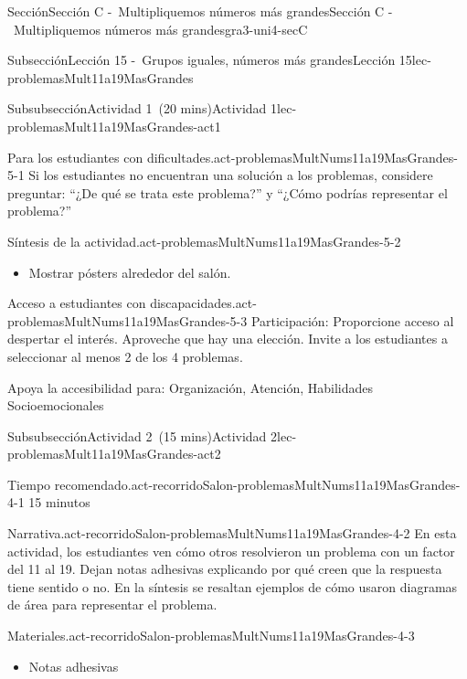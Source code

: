 \documentclass[oneside,10pt,]{article}
\begin{document}
\begin{sectionptx}{Sección}{Sección C -~Multipliquemos números más grandes}{}{Sección C -~Multipliquemos números más grandes}{}{}{gra3-uni4-secC}
\begin{subsectionptx}{Subsección}{Lección 15 -~Grupos iguales, números más grandes}{}{Lección 15}{}{}{lec-problemasMult11a19MasGrandes}
\begin{subsubsectionptx}{Subsubsección}{Actividad 1~(20 mins)}{}{Actividad 1}{}{}{lec-problemasMult11a19MasGrandes-act1}
\begin{paragraphs}{Para los estudiantes con dificultades.}{act-problemasMultNums11a19MasGrandes-5-1}
Si los estudiantes no encuentran una solución a los problemas, considere preguntar: ``¿De qué se trata este problema?'' y ``¿Cómo podrías representar el problema?''%
\end{paragraphs}%
\begin{paragraphs}{Síntesis de la actividad.}{act-problemasMultNums11a19MasGrandes-5-2}%
%
\begin{itemize}[label=\textbullet]
\item{}Mostrar pósters alrededor del salón.%
\end{itemize}
\end{paragraphs}%
\begin{paragraphs}{Acceso a estudiantes con discapacidades.}{act-problemasMultNums11a19MasGrandes-5-3}%
Participación: Proporcione acceso al despertar el interés. Aproveche que hay una elección. Invite a los estudiantes a seleccionar al menos 2 de los 4 problemas.%
\par
Apoya la accesibilidad para: Organización, Atención, Habilidades Socioemocionales%
\end{paragraphs}%
\end{subsubsectionptx}
%
%
\typeout{************************************************}
\typeout{************************************************}
%
\begin{subsubsectionptx}{Subsubsección}{Actividad 2~(15 mins)}{}{Actividad 2}{}{}{lec-problemasMult11a19MasGrandes-act2}
\par
\begin{paragraphs}{Tiempo recomendado.}{act-recorridoSalon-problemasMultNums11a19MasGrandes-4-1}%
15 minutos%
\end{paragraphs}%
\begin{paragraphs}{Narrativa.}{act-recorridoSalon-problemasMultNums11a19MasGrandes-4-2}%
En esta actividad, los estudiantes ven cómo otros resolvieron un problema con un factor del 11 al 19. Dejan notas adhesivas explicando por qué creen que la respuesta tiene sentido o no. En la síntesis se resaltan ejemplos de cómo usaron diagramas de área para representar el problema.%
\end{paragraphs}%
\begin{paragraphs}{Materiales.}{act-recorridoSalon-problemasMultNums11a19MasGrandes-4-3}%
%
\begin{itemize}[label=\textbullet]
\item{}Notas adhesivas%
\end{itemize}
\end{paragraphs}%

\end{subsubsectionptx}
\end{subsectionptx}
\end{sectionptx}
\end{document}
